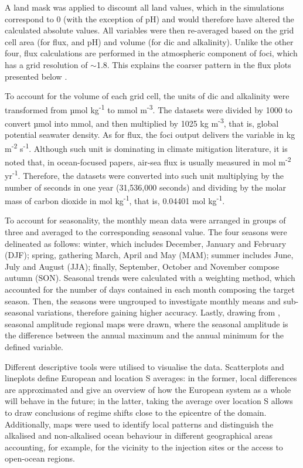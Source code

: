 A land mask was applied to discount all land values, which in the simulations correspond to 0 (with the exception of pH) and would therefore have altered the calculated absolute values. All variables were then re-averaged based on the grid cell area (for  flux,  and pH) and volume (for \ac{dic} and alkalinity). Unlike the other four,  flux calculations are performed in the atmospheric component of \ac{foci}, which has a grid resolution of $\sim$1.8\textdegree{}. This explains the coarser pattern in the  flux plots presented below \citep{matthes2020flexible}.

To account for the volume of each grid cell, the units of \ac{dic} and alkalinity were transformed from µmol kg\textsuperscript{-1} to mmol m\textsuperscript{-3}. The datasets were divided by 1000 to convert µmol into mmol, and then multiplied by 1025 kg m\textsuperscript{-3}, that is, global potential seawater density. As for  flux, the \ac{foci} output delivers the variable in kg m\textsuperscript{-2} s\textsuperscript{-1}. Although such unit is dominating in climate mitigation literature, it is noted that, in ocean-focused papers, air-sea  flux is usually measured in mol m\textsuperscript{-2} yr\textsuperscript{-1}. Therefore, the datasets were converted into such unit multiplying by the number of seconds in one year (31,536,000 seconds) and dividing by the molar mass of carbon dioxide in mol kg\textsuperscript{-1}, that is, 0.04401 mol kg\textsuperscript{-1}.

To account for seasonality, the monthly mean data were arranged in groups of three and averaged to the corresponding seasonal value. The four seasons were delineated as follows: winter, which includes December, January and February (DJF); spring, gathering March, April and May (MAM); summer includes June, July and August (JJA); finally, September, October and November compose autumn (SON). Seasonal trends were calculated with a weighting method, which accounted for the number of days contained in each month composing the target season. Then, the seasons were ungrouped to investigate monthly means and sub-seasonal variations, therefore gaining higher accuracy. Lastly, drawing from \cite{jo2022future}, seasonal amplitude regional maps were drawn, where the seasonal amplitude is the difference between the annual maximum and the annual minimum for the defined variable. 

Different descriptive tools were utilised to visualise the data. Scatterplots and lineplots define European and location S averages: in the former, local differences are approximated and give an overview of how the European system as a whole will behave in the future; in the latter, taking the average over location S allows to draw conclusions of regime shifts close to the epicentre of the domain. Additionally, maps were used to identify local patterns and distinguish the alkalised and non-alkalised ocean behaviour in different geographical areas accounting, for example, for the vicinity to the injection sites or the access to open-ocean regions.

